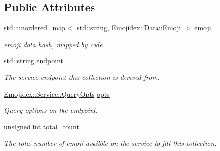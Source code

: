 \subsection*{Public Attributes}
\begin{DoxyCompactItemize}
\item 
std\+::unordered\+\_\+map$<$ std\+::string, \hyperlink{classEmojidex_1_1Data_1_1Emoji}{Emojidex\+::\+Data\+::\+Emoji} $>$ \hyperlink{classEmojidex_1_1Data_1_1Collection_aa8164e800401e64ce162ee5e734d9e74}{emoji}\hypertarget{classEmojidex_1_1Data_1_1Collection_aa8164e800401e64ce162ee5e734d9e74}{}\label{classEmojidex_1_1Data_1_1Collection_aa8164e800401e64ce162ee5e734d9e74}

\begin{DoxyCompactList}\small\item\em emoji data hash, mapped by code \end{DoxyCompactList}\item 
std\+::string \hyperlink{classEmojidex_1_1Data_1_1Collection_a937eedb36767877da7c793625bf919a6}{endpoint}\hypertarget{classEmojidex_1_1Data_1_1Collection_a937eedb36767877da7c793625bf919a6}{}\label{classEmojidex_1_1Data_1_1Collection_a937eedb36767877da7c793625bf919a6}

\begin{DoxyCompactList}\small\item\em The service endpoint this collection is derived from. \end{DoxyCompactList}\item 
\hyperlink{classEmojidex_1_1Service_1_1QueryOpts}{Emojidex\+::\+Service\+::\+Query\+Opts} \hyperlink{classEmojidex_1_1Data_1_1Collection_ade67a564b14f14375af66bc1a550ecdb}{opts}\hypertarget{classEmojidex_1_1Data_1_1Collection_ade67a564b14f14375af66bc1a550ecdb}{}\label{classEmojidex_1_1Data_1_1Collection_ade67a564b14f14375af66bc1a550ecdb}

\begin{DoxyCompactList}\small\item\em Query options on the endpoint. \end{DoxyCompactList}\item 
unsigned int \hyperlink{classEmojidex_1_1Data_1_1Collection_a0355662d1097dd631a6d6ce09875e8c3}{total\+\_\+count}\hypertarget{classEmojidex_1_1Data_1_1Collection_a0355662d1097dd631a6d6ce09875e8c3}{}\label{classEmojidex_1_1Data_1_1Collection_a0355662d1097dd631a6d6ce09875e8c3}

\begin{DoxyCompactList}\small\item\em The total number of emoji availble on the service to fill this collection. \end{DoxyCompactList}\end{DoxyCompactItemize}



